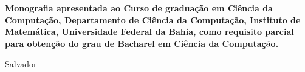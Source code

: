 

\begin{titlepage}
 \vfill
 \begin{center}
   {\large \uppercase{ \bf{ \meunome\ } } } \\[7cm]
   {\Huge \uppercase{ \bf{ \meutitulo\ } } }\\[1cm]
   \vfill
   \hspace{.45\textwidth} %
   \begin{minipage}{.5\textwidth}
     \begin{espacosimples}
       \bf{
	Monografia apresentada ao Curso de graduação em Ciência da Computação, 
	Departamento de Ciência da Computação, Instituto de Matemática,  Universidade Federal da 
	Bahia, como requisito parcial para obtenção do grau de Bacharel em  Ciência da Computação. \\ 
       }      
     \end{espacosimples}
     \begin{espacosimples}    
       \meuorientador
     \end{espacosimples}
   \end{minipage}
   \vfill
   Salvador \\
   \meuano
 \end{center}
\end{titlepage}
